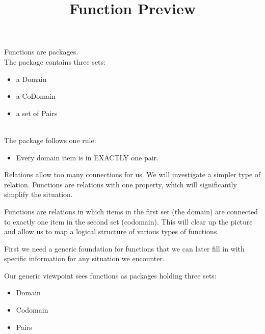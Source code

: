 \documentclass{ximera}
\title{Function Preview}
\begin{document}
\begin{abstract}
\end{abstract}

\maketitle





\begin{sectionOutcomes}

Functions are packages. \\
The package contains three sets:

\begin{itemize}
\item a Domain
\item a CoDomain
\item a set of Pairs
\end{itemize}
\quad \\

The package follows one rule:
\begin{itemize}
\item Every domain item is in EXACTLY one pair.
\end{itemize}

\end{sectionOutcomes}







Relations allow too many connections for us.  We will investigate a simpler type of relation. Functions are relations with one property, which will significantly simplify the situation.

Functions are relations in which items in the first set (the domain) are connected to exactly one item in the second set (codomain).  This will clear up the picture and allow us to map a logical structure of various types of functions.

First we need a generic foundation for functions that we can later fill in with specific information for any situation we encounter. 

Our generic viewpoint sees functions as packages holding three sets:
\begin{itemize}
\item Domain 
\item Codomain 
\item Pairs
\end{itemize}
\end{document}
